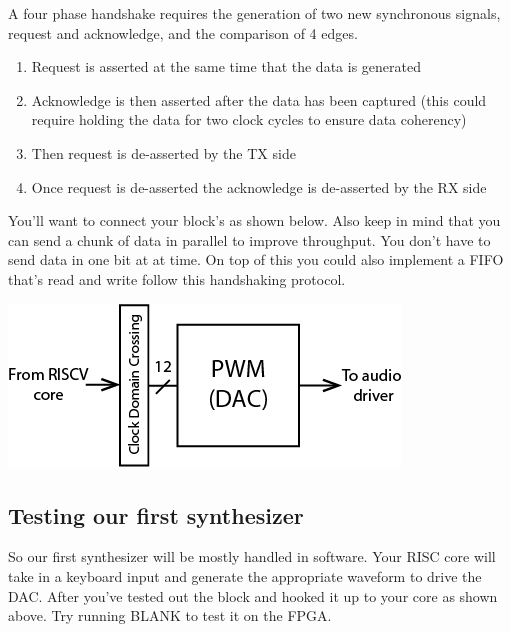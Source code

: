 \documentclass[11pt]{article}
\begin{document}
\newpage


A four phase handshake requires the generation of two new synchronous signals, request and acknowledge, and the comparison of 4 edges.
\begin{enumerate}
    \item Request is asserted at the same time that the data is generated
    \item Acknowledge is then asserted after the data has been captured (this could require holding the data for two clock cycles to ensure data coherency)
    \item Then request is de-asserted by the TX side
    \item Once request is de-asserted the acknowledge is de-asserted by the RX side
\end{enumerate}

You'll want to connect your block's as shown below. Also keep in mind that you can send a chunk of data in parallel to improve throughput. You don't have to send data in one bit at at time. On top of this you could also implement a FIFO that's read and write follow this handshaking protocol.  

\begin{center}
\includegraphics[width=\textwidth/2]{images/ss_dp_0.png}
\end{center}

\subsection{Testing our first synthesizer}

So our first synthesizer will be mostly handled in software. Your RISC core will take in a keyboard input and generate the appropriate waveform to drive the DAC. After you've tested out the block and hooked it up to your core as shown above. Try running BLANK to test it on the FPGA.
\end{document}
